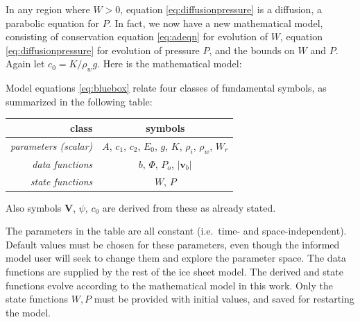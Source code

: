 \documentclass[11pt,final]{amsart}%
\newcommand*\mybluebox[1]{%
\colorbox{myblue}{\hspace{1em}#1\hspace{1em}}}
\newcommand\bv{\mathbf{v}}
\newcommand\bV{\mathbf{V}}
\newcommand{\Div}{\nabla\cdot}
\newcommand{\grad}{\nabla}
\begin{document}
In any region where $W>0$, equation \eqref{eq:diffusionpressure} is a diffusion, a parabolic equation for $P$.  In fact, we now have a new mathematical model, consisting of conservation equation \eqref{eq:adeqn} for evolution of $W$, equation \eqref{eq:diffusionpressure} for evolution of pressure $P$, and the bounds on $W$ and $P$.  Again let $c_0 = K / \rho_w g$.  Here is the mathematical model:

Model equations \eqref{eq:bluebox} relate four classes of fundamental symbols, as summarized in the following table:

\begin{table}[h]
\begin{tabular}{r|c}
class & symbols \\ \hline
\emph{parameters (scalar)} & $A$, $c_1$, $c_2$, $E_0$, $g$, $K$, $\rho_i$, $\rho_w$, $W_r$ \\
\emph{data functions} & $b$, $\Phi$, $P_o$, $|\bv_b|$ \\
\emph{state functions} & $W$, $P$
\end{tabular}
\end{table}

\noindent Also symbols $\bV$, $\psi$, $c_0$ are derived from these as already stated.

The parameters in the table are all constant (i.e.~time- and space-independent).  %
Default values must be chosen for these parameters, even though the informed model user will seek to change them and explore the parameter space.  The data functions are supplied by the rest of the ice sheet model.  The derived and state functions evolve according to the mathematical model in this work.  Only the state functions $W,P$ must be provided with initial values, and saved for restarting the model.
\end{document}
